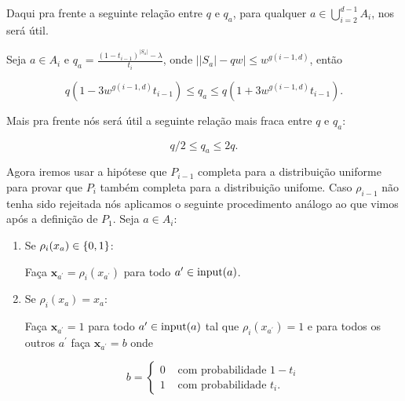 Daqui pra frente a seguinte relação entre $q$ e $q_{a}$, para qualquer $a \in \bigcup_{i = 2}^{d - 1}A_{i}$, nos será útil.

\begin{prop} \label{q_qa}

Seja $a \in A_{i}$ e $q_{a} = \frac{(1 - t_{i - 1})^{\lvert S_{a} \rvert} - \lambda}{t_{i}}$, onde $\big\lvert \lvert S_{a} \rvert - qw \big\rvert \leq w^{g(i -1, d)}$, então

\begin{equation*}
	q(1 - 3w^{g(i -1, d)}t_{i - 1}) \leq q_{a} \leq q(1 + 3w^{g(i -1, d)}t_{i - 1}).
\end{equation*}

\end{prop}

Mais pra frente nós será útil a seguinte relação mais fraca entre $q$ e $q_{a}$:

\begin{equation} \label{weaker_q_q_a}
    q/2 \leq q_{a} \leq 2q.
\end{equation}

Agora iremos usar a hipótese que $P_{i - 1}$ completa para a distribuição uniforme para provar que $P_{i}$ também completa para a distribuição unifome. Caso $\rho_{i - 1}$ não tenha sido rejeitada nós aplicamos o seguinte procedimento análogo ao que vimos após a definição de $P_{1}$. Seja $a \in A_{i}$:

\begin{enumerate}

	\item Se $\rho_{i}(x_{a}) \in \{0, 1\}$:
	
	Faça $\textbf{x}_{a^{\prime}} = \rho_{i}(x_{a^{\prime}})$ para todo $a^{\prime} \in \text{input}(a)$.
	
	\item Se $\rho_{i}(x_{a}) = x_{a}$:
	
	Faça $\textbf{x}_{a^{\prime}} = 1$ para todo $a^{\prime} \in \text{input}(a)$ tal que $\rho_{i}(x_{a^{\prime}}) = 1$ e para todos os outros $a^{\prime}$ faça $\textbf{x}_{a^{\prime}} = b$ onde
	
	\begin{equation*}
		b = \begin{cases}
				            0 & \text{ com probabilidade } 1 - t_{i} \\
				            1 & \text{ com probabilidade } t_{i}.
				        \end{cases}
	\end{equation*}

\end{enumerate}

